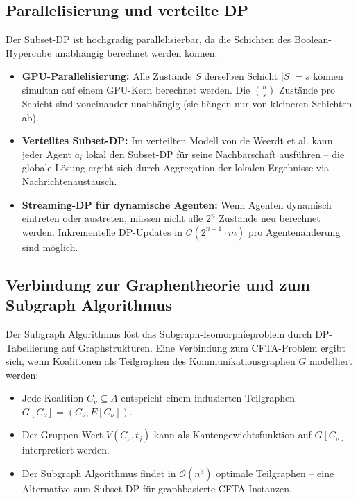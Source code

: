﻿\documentclass[a4paper,12pt]{article}
\theoremstyle{definition}
\begin{document}
\subsection{Parallelisierung und verteilte DP}

Der Subset-DP ist hochgradig parallelisierbar, da die Schichten des
Boolean-Hypercube unabh\"{a}ngig berechnet werden k\"{o}nnen:

\begin{itemize}
    \item \textbf{GPU-Parallelisierung:} Alle Zust\"{a}nde $S$ derselben
          Schicht $|S| = s$ k\"{o}nnen simultan auf einem GPU-Kern berechnet
          werden. Die $\binom{n}{s}$ Zust\"{a}nde pro Schicht sind voneinander
          unabh\"{a}ngig (sie h\"{a}ngen nur von kleineren Schichten ab).
    \item \textbf{Verteiltes Subset-DP:} Im verteilten Modell von de Weerdt
          et al. kann jeder Agent $a_i$ lokal den Subset-DP f\"{u}r seine
          Nachbarschaft ausf\"{u}hren -- die globale L\"{o}sung ergibt sich durch
          Aggregation der lokalen Ergebnisse via Nachrichtenaustausch.
    \item \textbf{Streaming-DP f\"{u}r dynamische Agenten:} Wenn Agenten
          dynamisch eintreten oder austreten, m\"{u}ssen nicht alle $2^n$
          Zust\"{a}nde neu berechnet werden. Inkrementelle DP-Updates in
          $\mathcal{O}(2^{n-1} \cdot m)$ pro Agenten\"{a}nderung sind m\"{o}glich.
\end{itemize}

\subsection{Verbindung zur Graphentheorie und zum Subgraph Algorithmus}

Der Subgraph Algorithmus \cite{epp2026subgraph} l\"{o}st das Subgraph-Isomorphieproblem
durch DP-Tabellierung auf Graphstrukturen. Eine Verbindung zum CFTA-Problem ergibt sich,
wenn Koalitionen als Teilgraphen des Kommunikationsgraphen $G$ modelliert werden:

\begin{itemize}
    \item Jede Koalition $C_\nu \subseteq A$ entspricht einem induzierten
          Teilgraphen $G[C_\nu] = (C_\nu, E[C_\nu])$.
    \item Der Gruppen-Wert $V(C_\nu, t_j)$ kann als Kantengewichtsfunktion
          auf $G[C_\nu]$ interpretiert werden.
    \item Der Subgraph Algorithmus findet in $\mathcal{O}(n^3)$ optimale
          Teilgraphen -- eine Alternative zum Subset-DP f\"{u}r graphbasierte
          CFTA-Instanzen.
\end{itemize}
\end{document}
